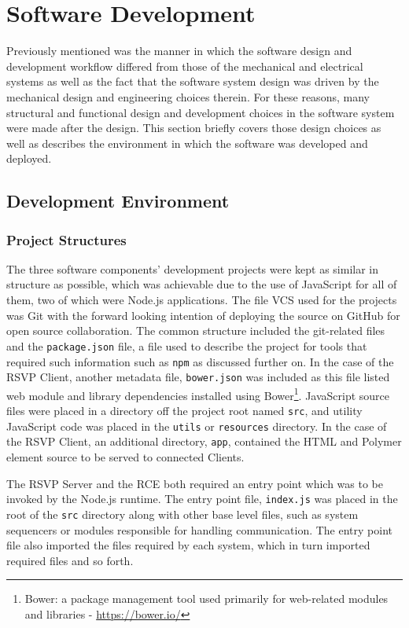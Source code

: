 \section{Software Development}
\label{sec:softwareDevelopment}
  Previously mentioned was the manner in which the software design and development workflow differed from those of the mechanical and electrical systems as well as the fact that the software system design was driven by the mechanical design and engineering choices therein. For these reasons, many structural and functional design and development choices in the software system were made after the design. This section briefly covers those design choices as well as describes the environment in which the software was developed and deployed.
    
  \subsection{Development Environment}
    \subsubsection{Project Structures}
      The three software components' development projects were kept as similar in structure as possible, which was achievable due to the use of JavaScript for all of them, two of which were Node.js applications. The file VCS used for the projects was Git with the forward looking intention of deploying the source on GitHub for open source collaboration. The common structure included the git-related files and the \texttt{package.json} file, a file used to describe the project for tools that required such information such as \texttt{npm} as discussed further on. In the case of the RSVP Client, another metadata file, \texttt{bower.json} was included as this file listed web module and library dependencies installed using Bower\footnote{Bower: a package management tool used primarily for web-related modules and libraries - \url{https://bower.io/}}. JavaScript source files were placed in a directory off the project root named \texttt{src}, and utility JavaScript code was placed in the \texttt{utils} or \texttt{resources} directory. In the case of the RSVP Client, an additional directory, \texttt{app}, contained the HTML and Polymer element source to be served to connected Clients.
      
      The RSVP Server and the RCE both required an entry point which was to be invoked by the Node.js runtime. The entry point file, \texttt{index.js} was placed in the root of the \texttt{src} directory along with other base level files, such as system sequencers or modules responsible for handling communication. The entry point file also imported the files required by each system, which in turn imported required files and so forth.
      
